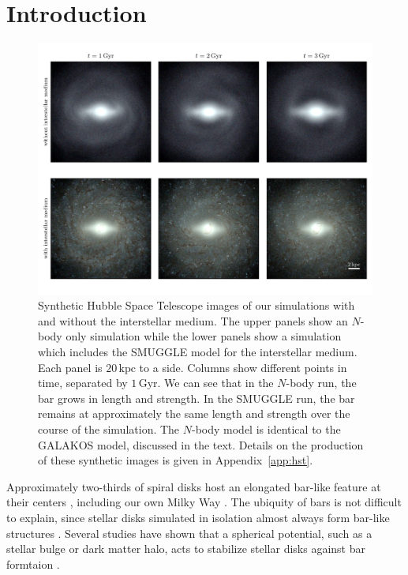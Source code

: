 \documentclass[twocolumn,linenumbers]{aastex631}
\newcommand{\Nbody}{$N$-body}
\newcommand{\SMUGGLE}{SMUGGLE}
\begin{document}
\section{Introduction}
\label{sec:intro}
\begin{figure}
    \centering
    \includegraphics[width=\textwidth]{fig/mockHST.pdf}
    \caption{Synthetic Hubble Space Telescope images of our simulations with and
    without the interstellar medium. The upper panels show an \Nbody{} only
    simulation while the lower panels show a simulation which includes the
    \SMUGGLE{} model for the interstellar medium. Each panel is $20\,\textrm{kpc}$
    to a side. Columns show different points in time, separated by
    $1\,\textrm{Gyr}$. We can see that in the \Nbody{} run, the bar grows in
    length and strength. In the \SMUGGLE{} run, the bar remains at approximately
    the same length and strength over the course of the simulation. The \Nbody{}
    model is identical to the GALAKOS model, discussed in the text. Details on
    the production of these synthetic images is given in Appendix~\ref{app:hst}.}\label{fig:overview}
\end{figure}

Approximately two-thirds of spiral disks host an elongated bar-like feature at
their centers \citep{2000AJ....119..536E, 2007ApJ...657..790M}, including our
own Milky Way \citep{1957AJ.....62...19J, 1991ApJ...379..631B}. The ubiquity of
bars is not difficult to explain, since stellar disks simulated in isolation
almost always form bar-like structures \citep{1971ApJ...168..343H}. Several
studies have shown that a spherical potential, such as a stellar bulge or dark
matter halo, acts to stabilize stellar disks against bar formtaion
\citep[e.g.,][]{1973ApJ...186..467O, 1976AJ.....81...30H}.
\end{document}
